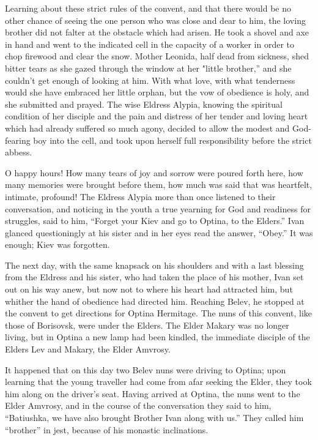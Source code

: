 Learning about these strict rules of the convent, and that there would be no other chance of seeing the one person who was close and dear to him, the loving brother did not falter at the obstacle which had arisen. He took a shovel and axe in hand and went to the indicated cell in the capacity of a worker in order to chop firewood and clear the snow. Mother Leonida, half dead from sickness, shed bitter tears as she gazed through the window at her "little brother,” and she couldn't get enough of looking at him. With what love, with what tenderness would she have embraced her little orphan, but the vow of obedience is holy, and she submitted and prayed. The wise Eldress Alypia, knowing the spiritual condition of her disciple and the pain and distress of her tender and loving heart which had already suffered so much agony, decided to allow the modest and God-fearing boy into the cell, and took upon herself full responsibility before the strict abbess.

O happy hours! How many tears of joy and sorrow were poured forth here, how many memories were brought before them, how much was said that was heartfelt, intimate, profound! The Eldress Alypia more than once listened to their conversation, and noticing in the youth a true yearning for God and readiness for struggles, said to him, “Forget your Kiev and go to Optina, to the Elders.” Ivan glanced questioningly at his sister and in her eyes read the answer, “Obey.” It was enough; Kiev was forgotten.

The next day, with the same knapsack on his shoulders and with a last blessing from the Eldress and his sister, who had taken the place of his mother, Ivan set out on his way anew, but now not to where his heart had attracted him, but whither the hand of obedience had directed him. Reaching Belev, he stopped at the convent to get directions for Optina Hermitage. The nuns of this convent, like those of Borisovsk, were under the Elders. The Elder Makary was no longer living, but in Optina a new lamp had been kindled, the immediate disciple of the Elders Lev and Makary, the Elder Amvrosy.

It happened that on this day two Belev nuns were driving to Optina; upon learning that the young traveller had come from afar seeking the Elder, they took him along on the driver's seat. Having arrived at Optina, the nuns went to the Elder Amvrosy, and in the course of the conversation they said to him, “Batiushka, we have also brought Brother Ivan along with us.” They called him “brother” in jest, because of his monastic inclinations.

